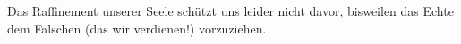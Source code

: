 Das Raffinement unserer Seele schützt uns leider nicht davor, bisweilen das Echte dem Falschen (das wir verdienen!) vorzuziehen.
\par

